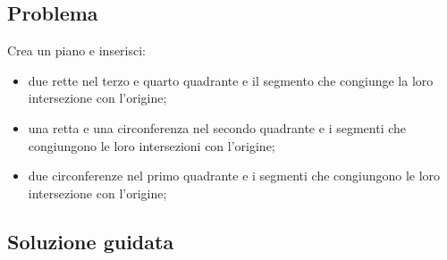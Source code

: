 \subsection{Problema}

Crea un piano e inserisci:

\begin{itemize} [noitemsep]
\item due rette nel terzo e quarto quadrante
e il segmento che congiunge la loro intersezione con l'origine;
\item una retta e una circonferenza nel secondo quadrante 
e i segmenti che congiungono le loro intersezioni con l'origine;
\item due circonferenze nel primo quadrante 
e i segmenti che congiungono le loro intersezione con l'origine;
\end{itemize}


\subsection{Soluzione guidata}

